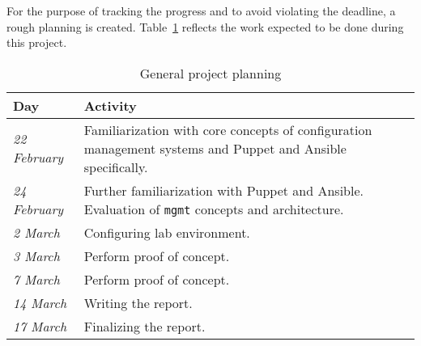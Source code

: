 For the purpose of tracking the progress and to avoid violating the deadline, a rough planning is created. Table~\ref{tab:planning} reflects the work expected to be done during this project. 

\begin{table}[!h]
\centering
\begin{tabular}{ll}
\toprule
\textbf{Day}         & \textbf{Activity} \\ \midrule
\textit{22 February} & Familiarization with core concepts of configuration management systems and Puppet and Ansible specifically. \\
\textit{24 February} & Further familiarization with Puppet and Ansible. Evaluation of \texttt{mgmt} concepts and architecture. \\
\textit{2 March}     & Configuring lab environment. \\
\textit{3 March}     & Perform proof of concept. \\
\textit{7 March}     & Perform proof of concept. \\
\textit{14 March}    & Writing the report. \\ 
\textit{17 March}    & Finalizing the report. \\\bottomrule
\end{tabular}
\caption{General project planning}
\label{tab:planning}
\end{table} 



